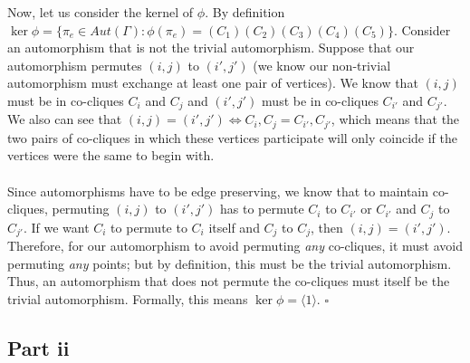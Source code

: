 \documentclass[letterpaper]{article}
\newcommand*{\QED}{\hfill\ensuremath{\square}}%
\begin{document}
Now, let us consider the kernel of $ \phi $.
By definition $ \ker{\phi} = \{ \pi_e \in Aut(\Gamma) : \phi(\pi_e) = (C_1)(C_2)(C_3)(C_4)(C_5) \} $.
Consider an automorphism that is not the trivial automorphism.
Suppose that our automorphism permutes $ (i, j) $ to $ (i', j') $ (we know our non-trivial automorphism must exchange at least one pair of vertices).
We know that $ (i, j) $ must be in co-cliques $ C_i $ and $ C_j $ and $ (i', j') $ must be in co-cliques $ C_{i'} $ and $ C_{j'} $.
We also can see that $ (i, j) = (i', j') \iff C_i, C_j = C_{i'}, C_{j'} $, which means that the two pairs of co-cliques in which these vertices participate will only coincide if the vertices were the same to begin with.
\\ \\
Since automorphisms have to be edge preserving, we know that to maintain co-cliques, permuting $ (i, j) $ to $ (i', j') $ has to permute $ C_i $ to $ C_{i'} $ or $ C_{i'} $ and $ C_{j} $ to $ C_{j'} $.
If we want $ C_i $ to permute to $ C_{i} $ itself and $ C_j $ to $ C_j $, then $ (i,j) = (i', j') $.
Therefore, for our automorphism to avoid permuting \textit{any} co-cliques, it must avoid permuting \textit{any} points; but by definition, this must be the trivial automorphism.
Thus, an automorphism that does not permute the co-cliques must itself be the trivial automorphism.
Formally, this means $ \ker{\phi} = \langle 1 \rangle $.
\QED{}

\subsection{Part ii}
\label{subs:2Partii}
\end{document}
